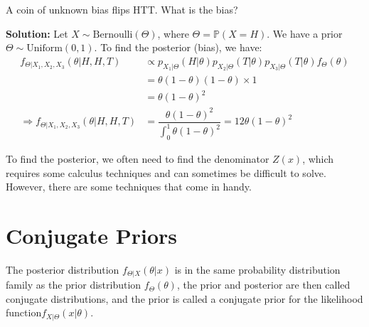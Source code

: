 \newpage
\begin{eg}
  A coin of unknown bias flips HTT. What is the bias?

  \textbf{Solution:} 
  Let \(X \sim \text{Bernoulli}(\Theta)\), where \(\Theta = \mathbb{P}(X = H)\). We have a prior \(\Theta \sim \text{Uniform}(0, 1)\). To find the posterior (bias), we have:
  \[
    \begin{aligned}
      f_{\Theta \vert X_1, X_2, X_3} (\theta \vert H,H,T) &\propto p_{X_1 \vert \Theta} (H \vert \theta) p_{X_2 \vert \Theta} (T \vert \theta) p_{X_3 \vert \Theta} (T \vert \theta) f_{\Theta} (\theta) \\
      &= \theta (1 - \theta) (1 - \theta) \times 1 \\
      &= \theta (1 - \theta)^2 \\
      \Longrightarrow f_{\Theta \vert X_1, X_2, X_3} (\theta \vert H,H,T) &= \dfrac{\theta (1 - \theta)^2}{\int_0 ^1 \theta  (1 - \theta)^2} = 12\theta (1 - \theta)^2
    \end{aligned}
  \]
\end{eg}

To find the posterior, we often need to find the denominator \(Z(x)\), which requires some calculus techniques and can sometimes be difficult to solve. However, there are some techniques that come in handy.

\section{Conjugate Priors}

\begin{definition}
  The posterior distribution \(f_{\Theta \vert X} (\theta \vert x)\) is in the same probability distribution family as the prior distribution \(f_{\Theta} (\theta)\), the prior and posterior are then called conjugate distributions, and the prior is called a conjugate prior for
  the likelihood function\(f_{X \vert \Theta} (x \vert \theta)\).
\end{definition}


